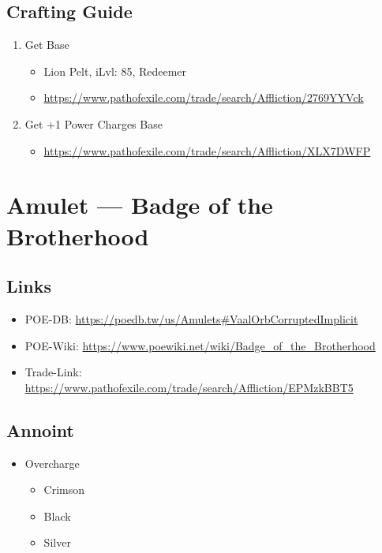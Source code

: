 \subsection{Crafting Guide}
\begin{enumerate}
	\item Get Base
	\begin{itemize}
		\item Lion Pelt, iLvl: 85, Redeemer
		\item \url{https://www.pathofexile.com/trade/search/Affliction/2769YYVck}
	\end{itemize}
	\item Get +1 Power Charges Base
	\begin{itemize}
		\item \url{https://www.pathofexile.com/trade/search/Affliction/XLX7DWFP}
	\end{itemize}
\end{enumerate}

\section{Amulet --- Badge of the Brotherhood}
\subsection{Links}
\begin{itemize}
	\item POE-DB: \url{https://poedb.tw/us/Amulets#VaalOrbCorruptedImplicit}
	\item POE-Wiki: \url{https://www.poewiki.net/wiki/Badge_of_the_Brotherhood}
	\item Trade-Link: \url{https://www.pathofexile.com/trade/search/Affliction/EPMzkBBT5}
\end{itemize}

\subsection{Annoint}
\begin{itemize}
	\item Overcharge
	\begin{itemize}
		\item Crimson
		\item Black
		\item Silver
	\end{itemize}
\end{itemize}

